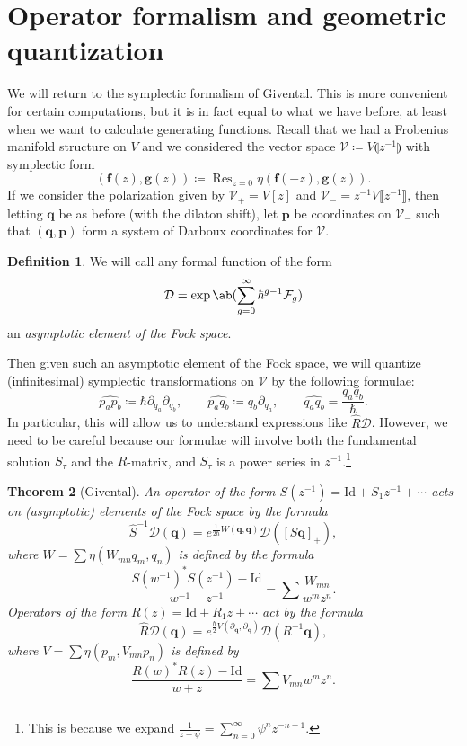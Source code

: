 \documentclass{amsart}
\newtheorem{thm}{Theorem}[section]
\theoremstyle{definition}
\newtheorem{defn}[thm]{Definition}
\theoremstyle{remark}
\theoremstyle{plain}
\theoremstyle{definition}
\theoremstyle{remark}
\newcommand{\mc}[1]{\mathcal{#1}}
\newcommand{\mbf}[1]{\mathbf{#1}}
\newcommand{\bq}{\mbf{q}}
\newcommand{\bp}{\mbf{p}}
\newcommand{\mr}[1]{\mathrm{#1}}
\newcommand{\on}[1]{\operatorname{#1}}
\newcommand{\wh}[1]{\widehat{#1}}
\newcommand{\1}{\mathbf{1}}
\newcommand{\2}{\mathbf{2}}
\newcommand{\3}{\mathbf{3}}
\newcommand{\ps}[1]{\llbracket #1 \rrbracket}
\newcommand{\ls}[1]{\llparenthesis #1 \rrparenthesis}
\begin{document}
\section{Operator formalism and geometric quantization}%
\label{sec:Operator formalism and geometric quantization}

We will return to the symplectic formalism of Givental. This is more convenient for certain computations, but it is in fact equal to what we have before, at least when we want to calculate generating functions. Recall that we had a Frobenius manifold structure on $V$ and we considered the vector space $\mc{V}\coloneqq V\ls{z^{-1}}$ with symplectic form
\[ (\mbf{f}(z), \mbf{g}(z)) \coloneqq \on{Res}_{z=0} \eta(\mbf{f}(-z), \mbf{g}(z)). \]
If we consider the polarization given by $\mc{V}_+ = V[z]$ and $\mc{V}_- = z^{-1}V\ps{z^{-1}}$, then letting $\bq$ be as before (with the dilaton shift), let $\bp$ be coordinates on $\mc{V}_-$ such that $(\bq, \bp)$ form a system of Darboux coordinates for $\mc{V}$.

\begin{defn}
    We will call any formal function of the form
    \[ \mc{D} = \exp\ab(\sum_{g=0}^{\infty} \hbar^{g-1} \mc{F}_g) \]
    an \textit{asymptotic element of the Fock space}.
\end{defn}

Then given such an asymptotic element of the Fock space, we will quantize (infinitesimal) symplectic transformations on $\mc{V}$ by the following formulae:
\[ \wh{p_a p_b} \coloneqq \hbar \partial_{q_a} \partial_{q_b}, \qquad \wh{p_a q_b} \coloneqq q_b \partial_{q_a}, \qquad \wh{q_a q_b} = \frac{q_a q_b}{\hbar}. \]
In particular, this will allow us to understand expressions like $\hat{R} \mc{D}$. However, we need to be careful because our formulae will involve both the fundamental solution $S_{\tau}$ and the $R$-matrix, and $S_{\tau}$ is a power series in $z^{-1}$.\footnote{This is because we expand $\frac{1}{z-\psi} = \sum_{n=0}^{\infty} \psi^n z^{-n-1}$.}

\begin{thm}[Givental]
    An operator of the form $S(z^{-1}) = \mr{Id} + S_1 z^{-1} + \cdots$ acts on (asymptotic) elements of the Fock space by the formula
    \[ \hat{S}^{-1} \mc{D}(\bq) = e^{\frac{1}{2\hbar}W(\bq,\bq)} \mc{D}([S \bq]_+), \]
    where $W = \sum \eta(W_{mn}q_m, q_n)$ is defined by the formula
    \[ \frac{S(w^{-1})^* S(z^{-1}) - \mr{Id}}{w^{-1}+z^{-1}} = \sum \frac{W_{mn}}{w^m z^n}. \]
    Operators of the form $R(z) = \mr{Id} + R_1 z + \cdots$ act by the formula
    \[ \hat{R}\mc{D}(\bq) = e^{\frac{\hbar}{2} V(\partial_{\bq}, \partial_{\bq})} \mc{D}(R^{-1} \bq), \]
    where $V = \sum \eta(p_m, V_{mn} p_n)$ is defined by 
    \[ \frac{R(w)^* R(z) - \mr{Id}}{w+z} = \sum V_{mn} w^m z^n. \]
\end{thm}
\end{document}

